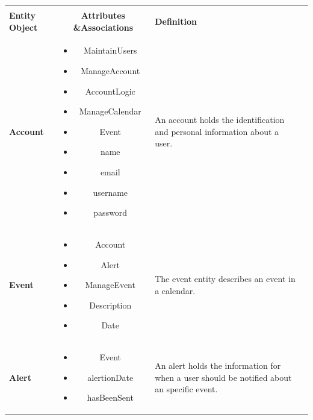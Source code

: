 \documentclass{article}
\begin{document}
\begin{tabular}{l c l @{} l}
	\multicolumn{2}{c}{} \\
	\textbf{Entity Object}&\textbf{Attributes \&Associations}&\textbf{Definition}\\
	\hline
	\textbf{Account}&\parbox{.45\textwidth}{
            \begin{itemize}
                \item MaintainUsers
                \item ManageAccount 
                \item AccountLogic
                \item ManageCalendar
                \item Event
                \item name
                \item email
                \item username
                \item password
            \end{itemize} }
&\parbox{.3\textwidth}{
            An account holds the identification and personal information about a user. } \\
	\hline
	\textbf{Event}&\parbox{.45\textwidth}{
            \begin{itemize}
                \item Account
                \item Alert 
                \item ManageEvent
                \item Description
                \item Date
            \end{itemize} }
&\parbox{.3\textwidth}{
            The event entity describes an event in a calendar. } \\
	\hline
	\textbf{Alert}&\parbox{.45\textwidth}{
            \begin{itemize}
                \item Event
                \item alertionDate
                \item hasBeenSent
            \end{itemize} }
&\parbox{.3\textwidth}{
            An alert holds the information for when a user should be notified about an specific event.  } \\
	\hline
\end{tabular}
\end{document}

